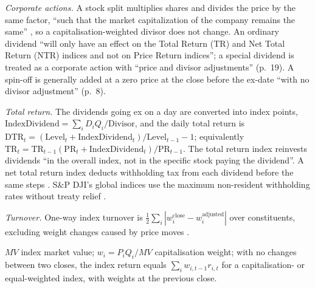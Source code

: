 \begin{qfmethod}
\emph{Corporate actions.} A stock split multiplies shares and divides the price by the same factor, ``such that the market capitalization of the company remains the same'' \citep[p.~24]{equity-index-policies-2026}, so a capitalisation-weighted divisor does not change. An ordinary dividend ``will only have an effect on the Total Return (TR) and Net Total Return (NTR) indices and not on Price Return indices''; a special dividend is treated as a corporate action with ``price and divisor adjustments'' (p.~19). A spin-off is generally added at a zero price at the close before the ex-date ``with no divisor adjustment'' (p.~8).

\emph{Total return.} The dividends going ex on a day are converted into index points, $\text{IndexDividend}=\sum_i D_iQ_i/\text{Divisor}$, and the daily total return is $\text{DTR}_t=(\text{Level}_t+\text{IndexDividend}_t)/\text{Level}_{t-1}-1$; equivalently $\text{TR}_t=\text{TR}_{t-1}(\text{PR}_t+\text{IndexDividend}_t)/\text{PR}_{t-1}$. The total return index reinvests dividends ``in the overall index, not in the specific stock paying the dividend''. A net total return index deducts withholding tax from each dividend before the same steps \citep[pp.~21--22]{index-mathematics-methodology-2026}. S\&P DJI's global indices use the maximum non-resident withholding rates without treaty relief \citep[p.~24]{equity-index-policies-2026}.

\emph{Turnover.} One-way index turnover is $\tfrac12\sum_i|w_i^{\text{close}}-w_i^{\text{adjusted}}|$ over constituents, excluding weight changes caused by price moves \citep[p.~70]{index-mathematics-methodology-2026}.

 $MV$ index market value; $w_i=P_iQ_i/MV$ capitalisation weight; with no changes between two closes, the index return equals $\sum_iw_{i,t-1}r_{i,t}$ for a capitalisation- or equal-weighted index, with weights at the previous close.


\end{qfmethod}
